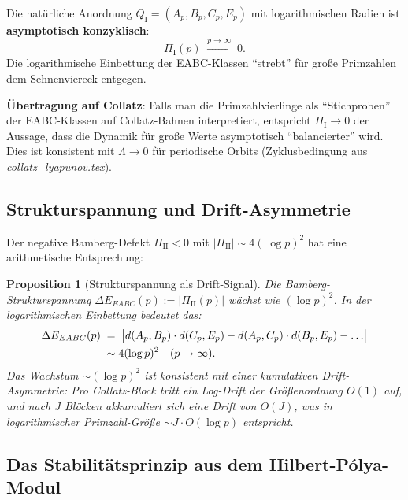 \documentclass[12pt,a4paper]{article}
\newtheorem{proposition}[definition]{Proposition}
\newcommand{\Ptol}{\Pi}             %
\begin{document}
\begin{tcolorbox}[ergebnis, title={Bamberg-Hauptbefund (numerisch)}]
Die natürliche Anordnung $Q_{\mathrm I} = (A_p, B_p, C_p, E_p)$
mit logarithmischen Radien ist \textbf{asymptotisch konzyklisch}:
\[
  \Ptol_{\mathrm{I}}(p) \;\xrightarrow{p \to \infty}\; 0.
\]
Die logarithmische Einbettung der EABC-Klassen ``strebt'' für große Primzahlen
dem Sehnenviereck entgegen.
\end{tcolorbox}

\textbf{Übertragung auf Collatz}: Falls man die Primzahlvierlinge als
``Stichproben'' der EABC-Klassen auf Collatz-Bahnen interpretiert, entspricht
$\Ptol_{\mathrm I} \to 0$ der Aussage, dass die Dynamik für große Werte
asymptotisch ``balancierter'' wird. Dies ist konsistent mit $\Lambda \to 0$
für periodische Orbits (Zyklusbedingung aus \textit{collatz\_lyapunov.tex}).

\subsection{Strukturspannung und Drift-Asymmetrie}

Der negative Bamberg-Defekt $\Ptol_{\mathrm{II}} < 0$ mit $|\Ptol_{\mathrm{II}}| \sim 4(\log p)^2$
hat eine arithmetische Entsprechung:

\begin{proposition}[Strukturspannung als Drift-Signal]
\label{prop:strukturspannung}
Die Bamberg-Strukturspannung $\Delta E_{EABC}(p) := |\Ptol_{\mathrm{II}}(p)|$ wächst wie
$(\log p)^2$. In der logarithmischen Einbettung bedeutet das:
\begin{align}
  \Delta E_{EABC}(p) \;&=\;
  \bigl|d(A_p,B_p)\cdot d(C_p,E_p) - d(A_p,C_p)\cdot d(B_p,E_p) - \ldots \bigr| \notag\\
  &\sim 4(\log p)^2 \quad (p \to \infty). \label{eq:strukturspannung}
\end{align}
Das Wachstum $\sim (\log p)^2$ ist konsistent mit einer kumulativen
Drift-Asymmetrie: Pro Collatz-Block tritt ein Log-Drift der Größenordnung
$O(1)$ auf, und nach $J$ Blöcken akkumuliert sich eine Drift von $O(J)$,
was in logarithmischer Primzahl-Größe $\sim J \cdot O(\log p)$ entspricht.
\end{proposition}

\subsection{Das Stabilitätsprinzip aus dem Hilbert-Pólya-Modul}
\end{document}
